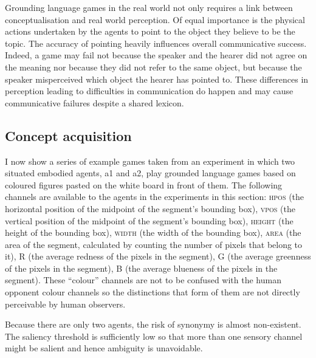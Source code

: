 Grounding language games in the real world
not only requires a link between conceptualisation
and real world perception. Of equal importance is the physical
actions undertaken by the agents to point to the object they 
believe to be the topic. The accuracy of pointing
heavily influences overall communicative success. Indeed, a
game may fail not because
the speaker and the hearer did not agree on the meaning
nor because they did not refer to the same object, but because the 
speaker misperceived which object the hearer has pointed to. 
These differences in perception leading to difficulties
in communication do happen and may 
cause communicative failures despite a shared lexicon. 

\subsection{Concept acquisition}

I now show a series of example games taken from 
an experiment in which two situated embodied agents,
{\bfshape a1} and {\bfshape a2}, play grounded language games based on 
coloured figures pasted on the white board in front
of them. The following channels are available to the agents 
in the experiments in this section: 
\textsc{hpos} (the horizontal position of the midpoint 
of the segment's bounding box), 
\textsc{vpos} (the vertical position of the midpoint of the segment's 
bounding box), \textsc{height} (the height of the bounding box), 
\textsc{width} (the width of the bounding box), \textsc{area}
(the area of the segment, calculated
by counting the number of pixels that belong to it), 
R (the average redness of the pixels in the segment), 
G (the average greenness of the pixels in the segment), 
B (the average blueness of the pixels in the segment). 
These ``colour'' channels are not to be confused with the 
human opponent colour channels so the distinctions 
that form of them are not directly perceivable by 
human observers.

Because there are only two agents, the 
risk of synonymy is almost non-existent. The saliency 
threshold is sufficiently low so that more than one
sensory channel might be salient and hence ambiguity
is unavoidable. 

